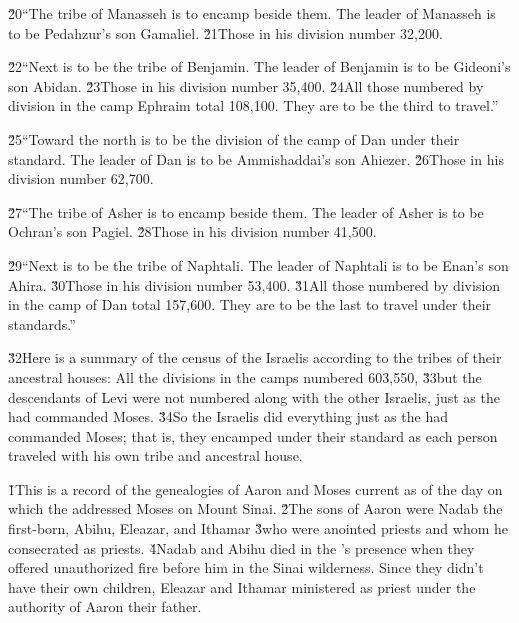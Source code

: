 \v{20}``The tribe of Manasseh is to encamp beside them. The leader of Manasseh is to be Pedahzur's son Gamaliel. \v{21}Those in his division number 32,200.

\v{22}``Next is to be the tribe of Benjamin. The leader of Benjamin is to be Gideoni's son Abidan. \v{23}Those in his division number 35,400. \v{24}All those numbered by division in the camp Ephraim total 108,100. They are to be the third to travel.''

\v{25}``Toward the north is to be the division of the camp of Dan under their standard. The leader of Dan is to be Ammishaddai's son Ahiezer. \v{26}Those in his division number 62,700.

\v{27}``The tribe of Asher is to encamp beside them. The leader of Asher is to be Ochran's son Pagiel. \v{28}Those in his division number 41,500.

\v{29}``Next is to be the tribe of Naphtali. The leader of Naphtali is to be Enan's son Ahira. \v{30}Those in his division number 53,400. \v{31}All those numbered by division in the camp of Dan total 157,600. They are to be the last to travel under their standards.''

\v{32}Here is a summary of the census of the Israelis according to the tribes of their ancestral houses: All the divisions in the camps numbered 603,550, \v{33}but the descendants of Levi were not numbered along with the other Israelis, just as the  had commanded Moses. \v{34}So the Israelis did everything just as the  had commanded Moses; that is, they encamped under their standard as each person traveled with his own tribe and ancestral house.

\v{1}This is a record of the genealogies of Aaron and Moses current as of the day on which the  addressed Moses on Mount Sinai. \v{2}The sons of Aaron were Nadab the first-born, Abihu, Eleazar, and Ithamar \v{3}who were anointed priests and whom he consecrated as priests. \v{4}Nadab and Abihu died in the 's presence when they offered unauthorized fire before him in the Sinai wilderness. Since they didn't have their own children, Eleazar and Ithamar ministered as priest under the authority of Aaron their father.

